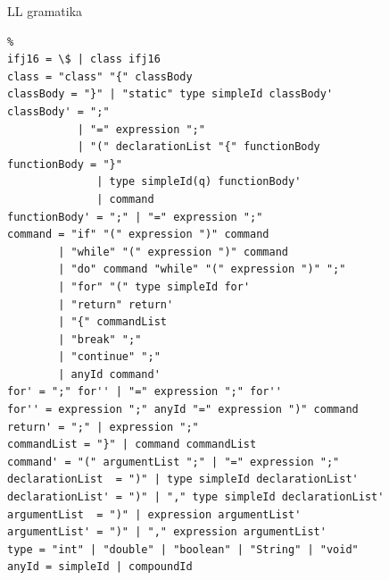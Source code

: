 \documentclass[13pt]{beamer}
\begin{document}
\begin{frame}[fragile]{LL gramatika}
\begin{lrbox}{\grammarbox}%
    \begin{lstlisting}%
ifj16 = \$ | class ifj16
class = "class" "{" classBody
classBody = "}" | "static" type simpleId classBody'
classBody' = ";"
           | "=" expression ";"
           | "(" declarationList "{" functionBody
functionBody = "}"
              | type simpleId(q) functionBody'
              | command
functionBody' = ";" | "=" expression ";"
command = "if" "(" expression ")" command
        | "while" "(" expression ")" command
        | "do" command "while" "(" expression ")" ";"
        | "for" "(" type simpleId for'
        | "return" return'
        | "{" commandList
        | "break" ";"
        | "continue" ";"
        | anyId command'
for' = ";" for'' | "=" expression ";" for''
for'' = expression ";" anyId "=" expression ")" command
return' = ";" | expression ";"
commandList = "}" | command commandList
command' = "(" argumentList ";" | "=" expression ";"
declarationList  = ")" | type simpleId declarationList'
declarationList' = ")" | "," type simpleId declarationList'
argumentList  = ")" | expression argumentList'
argumentList' = ")" | "," expression argumentList'
type = "int" | "double" | "boolean" | "String" | "void"
anyId = simpleId | compoundId
    \end{lstlisting}%
\end{lrbox}%
\scalebox{0.52}{\usebox{\grammarbox}}
\end{frame}
\end{document}
